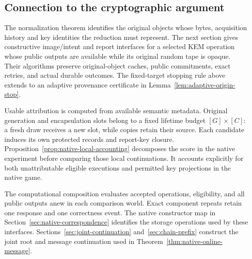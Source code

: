 \subsection{Connection to the cryptographic argument}

The normalization theorem identifies the original objects whose bytes,
acquisition history and key identities the reduction must represent. The
next section gives constructive image/intent and report interfaces for a selected KEM operation
whose public outputs are available while its original random tape is opaque.
Their algorithms preserve original-object caches, public commitments, exact
retries, and actual durable outcomes. The fixed-target stopping rule above
extends to an adaptive provenance certificate in
Lemma~\ref{lem:adaptive-origin-stop}.

Usable attribution is computed from available semantic metadata. Original
generation and encapsulation slots belong to a fixed lifetime budget
$[G]\times[C]$: a fresh draw receives a new slot, while copies retain their
source. Each candidate induces its own protected records and report-key
closure. Proposition~\ref{prop:native-local-accounting} decomposes the score
in the native experiment before comparing those local continuations. It
accounts explicitly for both unattributable eligible executions and permitted
key projections in the native game.

The computational composition evaluates accepted operations, eligibility, and
all public outputs anew in each comparison world. Exact component repeats
retain one response and one correctness event. The native constructor map in
Section~\ref{sec:native-correspondence} identifies the storage operations used
by these interfaces. Sections~\ref{sec:joint-continuation}
and~\ref{sec:chain-prefix} construct the joint root and message
continuation used in Theorem~\ref{thm:native-online-message}.
